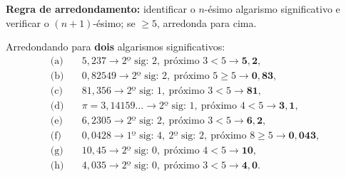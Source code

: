 \textbf{Regra de arredondamento:} identificar o $n$-ésimo algarismo significativo e verificar o $(n+1)$-ésimo; se $\geq5$, arredonda para cima.

Arredondando para \textbf{dois} algarismos significativos:
\begin{align*}
\text{(a)}&\quad 5{,}237 \to \text{2º sig: }2,\ \text{próximo } 3<5 \to \mathbf{5{,}2},\\
\text{(b)}&\quad 0{,}82549 \to \text{2º sig: }2,\ \text{próximo }5\geq5 \to \mathbf{0{,}83},\\
\text{(c)}&\quad 81{,}356 \to \text{2º sig: }1,\ \text{próximo }3<5 \to \mathbf{81},\\
\text{(d)}&\quad \pi=3{,}14159\ldots \to \text{2º sig: }1,\ \text{próximo }4<5 \to \mathbf{3{,}1},\\
\text{(e)}&\quad 6{,}2305 \to \text{2º sig: }2,\ \text{próximo }3<5 \to \mathbf{6{,}2},\\
\text{(f)}&\quad 0{,}0428 \to \text{1º sig: }4,\ \text{2º sig: }2,\ \text{próximo }8\geq5 \to \mathbf{0{,}043},\\
\text{(g)}&\quad 10{,}45 \to \text{2º sig: }0,\ \text{próximo }4<5 \to \mathbf{10},\\
\text{(h)}&\quad 4{,}035 \to \text{2º sig: }0,\ \text{próximo }3<5 \to \mathbf{4{,}0}.
\end{align*}